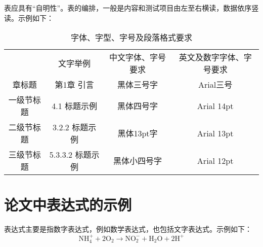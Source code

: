 \documentclass[degree=bachelor]{thuthesis}
\begin{document}
表应具有“自明性”。表的编排，一般是内容和测试项目由左至右横读，数据依序竖读。示例如下：

\begin{table}[h]
  \centering
  \caption{字体、字型、字号及段落格式要求}
  \label{tab:example-1}
  \begin{tabular}{cccc}
    & 文字举例 & 中文字体、字号要求 & 英文及数字字体、字号要求 \\
    章标题 & 第1章 引言 & 黑体三号字 & Arial三号 \\
    一级节标题 & 4.1 标题示例 & 黑体四号字 & Arial 14pt \\
    二级节标题 & 3.2.2 标题示例 & 黑体13pt字 & Arial 13pt \\
    三级节标题 & 5.3.3.2 标题示例 & 黑体小四号字 & Arial 12pt \\
  \end{tabular}
\end{table}

\clearpage


\section{论文中表达式的示例}

表达式主要是指数字表达式，例如数学表达式，也包括文字表达式。示例如下：
\begin{equation}
  \mathrm{NH}_4^+ + 2\mathrm{O}_2 \rightarrow \mathrm{NO}_2^- + \mathrm{H}_2 \mathrm{O} + 2 \mathrm{H}^+
\end{equation}



\nocite{*}
\end{document}
